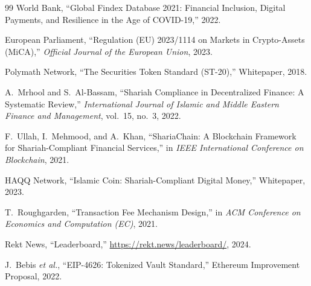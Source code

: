 \documentclass[11pt,twocolumn]{article}
\theoremstyle{definition}
\begin{document}
\begin{thebibliography}{99}
 World Bank, ``Global Findex Database 2021: Financial Inclusion, Digital Payments, and Resilience in the Age of COVID-19,'' 2022.

 European Parliament, ``Regulation (EU) 2023/1114 on Markets in Crypto-Assets (MiCA),'' \emph{Official Journal of the European Union}, 2023.

 Polymath Network, ``The Securities Token Standard (ST-20),'' Whitepaper, 2018.

 A.~Mrhool and S.~Al-Bassam, ``Shariah Compliance in Decentralized Finance: A Systematic Review,'' \emph{International Journal of Islamic and Middle Eastern Finance and Management}, vol.~15, no.~3, 2022.

 F.~Ullah, I.~Mehmood, and A.~Khan, ``ShariaChain: A Blockchain Framework for Shariah-Compliant Financial Services,'' in \emph{IEEE International Conference on Blockchain}, 2021.

 HAQQ Network, ``Islamic Coin: Shariah-Compliant Digital Money,'' Whitepaper, 2023.

 T.~Roughgarden, ``Transaction Fee Mechanism Design,'' in \emph{ACM Conference on Economics and Computation (EC)}, 2021.

 Rekt News, ``Leaderboard,'' \url{https://rekt.news/leaderboard/}, 2024.

 J.~Bebis \emph{et al.}, ``EIP-4626: Tokenized Vault Standard,'' Ethereum Improvement Proposal, 2022.

\end{thebibliography}
\end{document}
